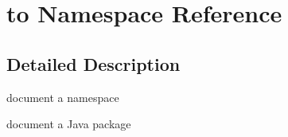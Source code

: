 \hypertarget{namespaceto}{}\section{to Namespace Reference}
\label{namespaceto}


\subsection{Detailed Description}
document a namespace

document a Java package 